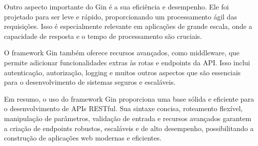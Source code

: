 Outro aspecto importante do Gin é a sua eficiência e desempenho. Ele foi projetado para ser leve e rápido, proporcionando um processamento ágil das requisições. Isso é especialmente relevante em aplicações de grande escala, onde a capacidade de resposta e o tempo de processamento são cruciais.

O framework Gin também oferece recursos avançados, como middleware, que permite adicionar funcionalidades extras às rotas e endpoints da API. Isso inclui autenticação, autorização, logging e muitos outros aspectos que são essenciais para o desenvolvimento de sistemas seguros e escaláveis.

Em resumo, o uso do framework Gin proporciona uma base sólida e eficiente para o desenvolvimento de APIs RESTful. Sua sintaxe concisa, roteamento flexível, manipulação de parâmetros, validação de entrada e recursos avançados garantem a criação de endpoints robustos, escaláveis e de alto desempenho, possibilitando a construção de aplicações web modernas e eficientes.

